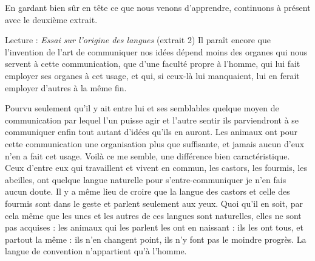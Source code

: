 En gardant bien sûr en tête ce que nous venons d’apprendre, continuons à présent avec le deuxième extrait.
\begin{lecture}{Lecture : \textit{Essai sur l’origine des langues} (extrait 2)}
Il paraît encore que l’invention de l’art de communiquer nos idées dépend moins des organes qui nous servent à cette communication, que d’une faculté propre à l’homme, qui lui fait employer ses organes à cet usage, et qui, si ceux-là lui manquaient, lui en ferait employer d’autres à la même fin.
\end{lecture}
Pourvu seulement qu’il y ait entre lui et ses semblables quelque moyen de communication par lequel l’un puisse agir et l’autre sentir ils parviendront à se communiquer enfin tout autant d’idées qu’ils en auront. Les animaux ont pour cette communication une organisation plus que suffisante, et jamais aucun d’eux n’en a fait cet usage. Voilà ce me semble, une différence bien caractéristique. Ceux d’entre eux qui travaillent et vivent en commun, les castors, les fourmis, les abeilles, ont quelque langue naturelle pour s’entre-communiquer je n’en fais aucun doute. Il y a même lieu de croire que la langue des castors et celle des fourmis sont dans le geste et parlent seulement aux yeux. Quoi qu’il en soit, par cela même que les unes et les autres de ces langues sont naturelles, elles ne sont pas acquises : les animaux qui les parlent les ont en naissant : ils les ont tous, et partout la même : ils n’en changent point, ils n’y font pas le moindre progrès. La langue de convention n’appartient qu’à l’homme.

